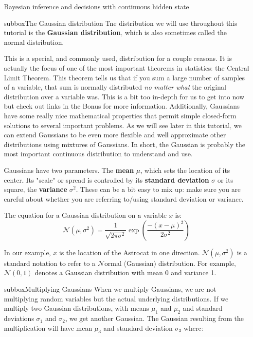 \begin{textbox}{\href{https://compneuro.neuromatch.io/tutorials/W3D1_BayesianDecisions/student/W3D1_Tutorial2.html}{Bayesian inference and decisions with continuous hidden state } }
\begin{subbox}{subbox}{The Gaussian distribution}
\scriptsize
Tne distribution we will use throughout this tutorial is the \textbf{Gaussian distribution}, which is also sometimes called the normal distribution. 

This is a special, and commonly used, distribution for a couple reasons. It is actually the focus of one of the most important theorems in statistics: the Central Limit Theorem. This theorem tells us that if you sum a large number of samples of a variable, that sum is normally distributed \textit{no matter what} the original distribution over a variable was. This is a bit too in-depth for us to get into now but check out links in the Bonus for more information. Additionally, Gaussians have some really nice mathematical properties that permit simple closed-form solutions to several important problems. As we will see later in this tutorial, we can extend Gaussians to be even more flexible and well approximate other distributions using mixtures of Gaussians. In short, the Gaussian is probably the most important continuous distribution to understand and use.

Gaussians have two parameters. The \textbf{mean} $\mu$, which sets the location of its center. Its "scale" or spread is controlled by its \textbf{standard deviation} $\sigma$ or its square, the \textbf{variance} $\sigma^2$. These can be a bit easy to mix up: make sure you are careful about whether you are referring to/using standard deviation or variance.


The equation for a Gaussian distribution on a variable $x$ is:
\begin{equation}
\mathcal{N}(\mu,\sigma^2) = \frac{1}{\sqrt{2\pi\sigma^2}}\exp\left(\frac{-(x-\mu)^2}{2\sigma^2}\right)
\end{equation}

In our example, $x$ is the location of the Astrocat in one direction. $\mathcal{N}(\mu,\sigma^2)$ is a standard notation to refer to a $\mathcal{N}$ormal (Gaussian) distribution. For example, $\mathcal{N}(0, 1)$ denotes a Gaussian distribution with mean 0 and variance 1. 

\end{subbox}

\begin{subbox}{subbox}{Multiplying Gaussians}
\scriptsize
When we multiply Gaussians, we are not multiplying random variables but the actual underlying distributions. If we multiply two Gaussian distributions, with means $\mu_1$ and $\mu_2$ and standard deviations $\sigma_1$ and $\sigma_2$, we get another Gaussian. The Gaussian resulting from the multiplication will have mean $\mu_3$ and standard deviation $\sigma_3$ where:


\end{subbox}
\end{textbox}
